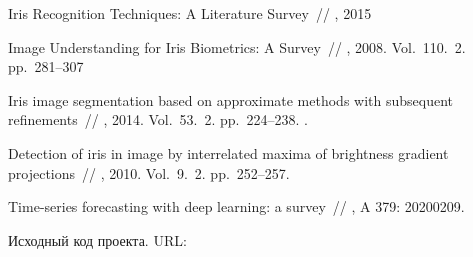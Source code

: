 \documentclass[12pt, twoside]{article}
\begin{document}
\begin{thebibliography}{99}


   Iris Recognition Techniques: A Literature Survey~//
    , 2015

   Image Understanding for Iris Biometrics: A Survey~//
    , 2008. Vol.~110. \No\,2. pp.~281--307
	
   Iris image segmentation based on approximate methods
with subsequent refinements~//
    , 2014. Vol.~53. \No\,2. pp.~224--238.
	.
	
   Detection of iris in image by interrelated maxima of brightness gradient projections~//
    , 2010. Vol.~9. \No\,2. pp.~252--257.
    
    Time-series forecasting with deep learning: a survey~//
	, A 379: 20200209.
	
	Исходный код проекта.
	URL: 
 
 	
\end{thebibliography}

\end{document}
